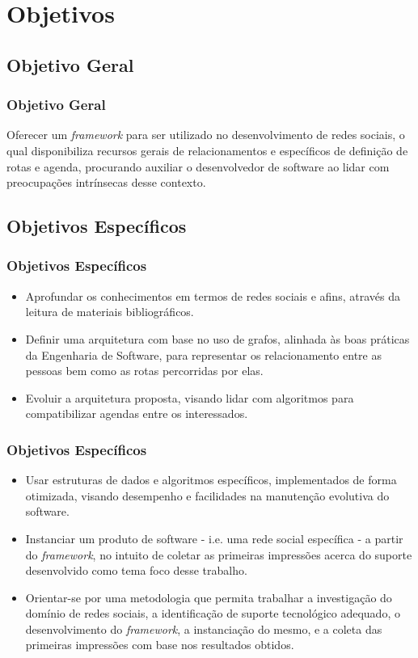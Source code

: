 \documentclass{beamer}
\begin{document}
\section{Objetivos}
\subsection{Objetivo Geral}

\begin{frame}
\frametitle{Objetivo Geral}

Oferecer um \textit{framework} para ser utilizado no desenvolvimento de redes sociais, o qual disponibiliza recursos gerais de relacionamentos e específicos de definição de rotas e agenda, procurando auxiliar o desenvolvedor de software ao lidar com preocupações intrínsecas desse contexto.

\end{frame}

\subsection{Objetivos Específicos}

\begin{frame}
\frametitle{Objetivos Específicos}

\begin{itemize}
	\item Aprofundar os conhecimentos em termos de redes sociais e afins, através da leitura de materiais bibliográficos.
	\item Definir uma arquitetura com base no uso de grafos, alinhada às boas práticas da Engenharia de Software, para representar os relacionamento entre as pessoas bem como as rotas percorridas por elas.
	\item Evoluir a arquitetura proposta, visando lidar com algoritmos para compatibilizar agendas entre os interessados.
\end{itemize}

\end{frame}

\begin{frame}
\frametitle{Objetivos Específicos}

\begin{itemize}
	\item Usar estruturas de dados e algoritmos específicos, implementados de forma otimizada, visando desempenho e facilidades na manutenção evolutiva do software.
	\item Instanciar um produto de software - i.e. uma rede social específica - a partir do \textit{framework}, no intuito de coletar as primeiras impressões acerca do suporte desenvolvido como tema foco desse trabalho.
	\item Orientar-se por uma metodologia que permita trabalhar a investigação do domínio de redes sociais, a identificação de suporte tecnológico adequado, o desenvolvimento do \textit{framework}, a instanciação do mesmo, e a coleta das primeiras impressões com base nos resultados obtidos.
\end{itemize}

\end{frame}
\end{document}

